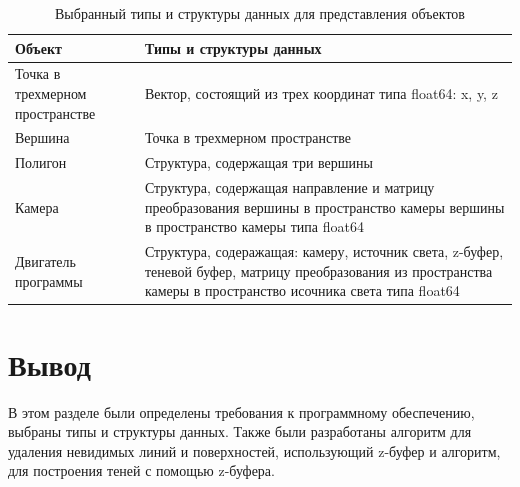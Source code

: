 \begin{table}[!ht]
    \centering
    \caption{\label{tab:object}Выбранный типы и структуры данных для представления объектов}
    \begin{tabular}{|p{6cm}|p{10cm}|}
    \hline
        Объект & Типы и структуры данных \\ \hline
        Точка в трехмерном пространстве & Вектор, состоящий из трех координат типа float64: x, y, z  \\ \hline
        Вершина & Точка в трехмерном пространстве \\ \hline
        Полигон & Структура, содержащая три вершины \\ \hline

        Камера &  Структура, содержащая направление и матрицу преобразования вершины
        в пространство камеры вершины в пространство камеры типа float64 \\ \hline

        Двигатель программы &  Структура, содеражащая: камеру,
        источник света, z-буфер, теневой буфер, 
        матрицу преобразования из пространства
        камеры в пространство исочника света типа float64\\ \hline
    \end{tabular}
\end{table}

\section*{Вывод}
В этом разделе были определены требования к программному обеспечению, выбраны типы и структуры данных. Также были разработаны 
алгоритм для удаления невидимых линий и поверхностей, использующий z-буфер и алгоритм, для построения теней с помощью z-буфера.
